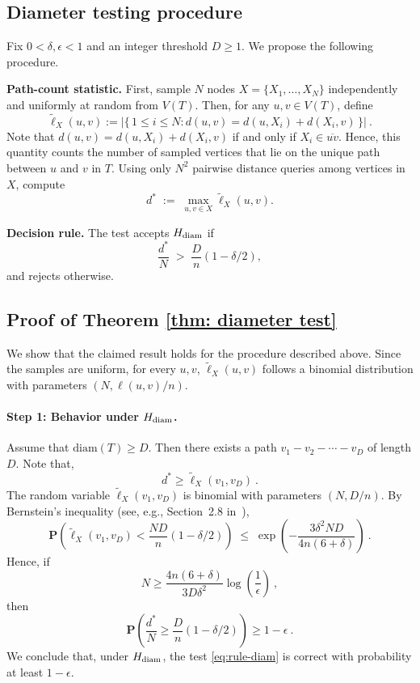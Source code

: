 \documentclass[12pt]{article}
\newcommand{\prob}[1]{\mathbf{P}\left( #1 \right)}
\newcommand{\diam}[1]{\mathrm{diam}\!\left(#1\right)}
\begin{document}
\subsection{Diameter testing procedure}

Fix $0<\delta,\epsilon<1$ and an integer threshold $D\ge1$.
We propose the following procedure.


\medskip
\noindent
\textbf{Path-count statistic.} First, sample $N$ nodes 
$
X=\{X_1,\dots,X_N\}
$
independently and uniformly at random from $V(T)$. Then, for any $u,v\in V(T)$, define
\[
\widetilde{\ell}_X(u,v)
:= \bigl|\{\,1\le i\le N : d(u,v)=d(u,X_i)+d(X_i,v)\,\}\bigr|~.
\]
Note that $d(u,v)=d(u,X_i)+d(X_i,v)$ if and only if $X_i\in \overline{uv}$. Hence, this quantity counts the number of sampled vertices that lie on the unique path between $u$ and $v$ in $T$.
Using only $N^2$ pairwise distance queries among vertices in $X$, compute
\[
d^* \;:=\; \max_{u,v\in X} \widetilde{\ell}_X(u,v).
\]

\medskip
\noindent
\textbf{Decision rule.}
The test accepts $H_{\rm diam}$ if
\begin{equation}\label{eq:rule-diam}
\frac{d^*}{N} \;>\; \frac{D}{n}(1-\delta/2),    
\end{equation}
and rejects otherwise.


\subsection{Proof of Theorem \ref{thm: diameter test}}

We show that the claimed result holds for the procedure described above. Since the samples are uniform, for every $u,v$, $\widetilde{\ell}_X(u,v)$ follows a binomial distribution with parameters
$\left(N,\ell(u,v)/n\right)$.


\paragraph{Step 1: Behavior under $H_{\rm diam}$.}
Assume that $\diam{T}\ge D$.
Then there exists a path $v_1- v_2-\cdots- v_D$ of length $D$.
Note that, 
\begin{equation}
d^*\ge \widetilde{\ell}_X(v_1,v_D)~. \label{eq:dstar-lower}
\end{equation}
The random variable $\widetilde{\ell}_X(v_1,v_D)$ is binomial with parameters $(N,D/n)$.
By Bernstein’s inequality (see, e.g., Section~2.8 in~\cite{BoLuMa03}),
\begin{equation}
\prob{\widetilde{\ell}_X(v_1,v_D)<\frac{ND}{n}(1-\delta/2)}
\;\le\;
\exp\!\left(-\frac{3\delta^2ND}{4n(6+\delta)}\right)~.
\end{equation}
Hence, if
\[
N \ge \frac{4n(6+\delta)}{3D\delta^2}\log\!\left(\frac{1}{\epsilon}\right)~,
\]
then
\[
\prob{\frac{d^*}{N}\ge \frac{D}{n}(1-\delta/2)}\ge 1-\epsilon~.
\]
We conclude that, under $H_{\rm diam}$, the test  \eqref{eq:rule-diam} is correct with probability at least $1-\epsilon$.
\end{document}
